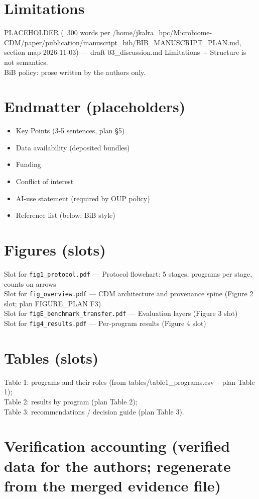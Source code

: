 \documentclass[11pt,a4paper]{article}
\begin{document}
\section{Limitations}
PLACEHOLDER (~300 words per /home/jkalra\_hpc/Microbiome-CDM/paper/publication/manuscript\_bib/BIB\_MANUSCRIPT\_PLAN.md, section map 2026-11-03) --- draft 03\_discussion.md Limitations + Structure is not semantics.\\
BiB policy: prose written by the authors only.

\section*{Endmatter (placeholders)}
\begin{itemize}
\item Key Points (3-5 sentences, plan §5)
\item Data availability (deposited bundles)
\item Funding
\item Conflict of interest
\item AI-use statement (required by OUP policy)
\item Reference list (below; BiB style)
\end{itemize}

\section*{Figures (slots)}
Slot for \texttt{fig1\_protocol.pdf} --- Protocol flowchart: 5 stages, programs per stage, counts on arrows\\
Slot for \texttt{fig\_overview.pdf} --- CDM architecture and provenance spine (Figure 2 slot; plan FIGURE\_PLAN F3)\\
Slot for \texttt{figE\_benchmark\_transfer.pdf} --- Evaluation layers (Figure 3 slot)\\
Slot for \texttt{fig4\_results.pdf} --- Per-program results (Figure 4 slot)

\section*{Tables (slots)}
Table 1: programs and their roles (from tables/table1\_programs.csv -- plan Table 1);\\Table 2: results by program (plan Table 2);\\Table 3: recommendations / decision guide (plan Table 3).

\section*{Verification accounting (verified data for the authors; regenerate from the merged evidence file)}
\end{document}
